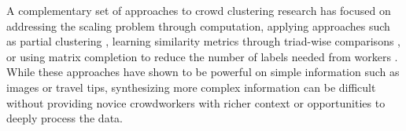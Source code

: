 



A complementary set of approaches to crowd clustering research has focused on
addressing the scaling problem through computation, applying approaches such as
partial clustering \cite{yi2012crowdclustering}, learning similarity metrics
through triad-wise comparisons \cite{tamuz2011adaptively}, or using matrix
completion to reduce the number of labels needed from
workers \cite{yi2012semi}. 
While these approaches have shown to be powerful on simple
information such as images or travel tips, synthesizing more complex
information can be difficult without providing novice crowdworkers with richer
context or opportunities to deeply process the data. 

